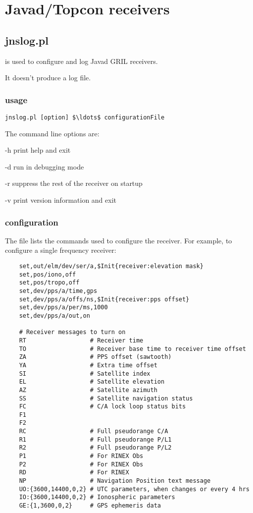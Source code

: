\section{Javad/Topcon receivers}

\subsection{jnslog.pl}
\hypertarget{h:jnslog}{}

 is used to configure and log Javad GRIL receivers.

It doesn't produce a log file.

\subsubsection{usage}

\begin{lstlisting}[mathescape=true]
jnslog.pl [option] $\ldots$ configurationFile
\end{lstlisting}

The command line options are:
\begin{description*}
 \item[-h] print help and exit
 \item[-d] run in debugging mode
 \item[-r] suppress the rest of the receiver on startup
 \item[-v] print version information and exit
\end{description*}

\subsubsection{configuration}

The file  lists the commands used to configure the receiver.
For example, to configure a single frequency receiver:
\begin{lstlisting}
    set,out/elm/dev/ser/a,$Init{receiver:elevation mask}
    set,pos/iono,off  
    set,pos/tropo,off 
    set,dev/pps/a/time,gps
    set,dev/pps/a/offs/ns,$Init{receiver:pps offset}
    set,dev/pps/a/per/ms,1000
    set,dev/pps/a/out,on
    
    # Receiver messages to turn on
    RT                  # Receiver time
    TO                  # Receiver base time to receiver time offset
    ZA                  # PPS offset (sawtooth)
    YA                  # Extra time offset 
    SI                  # Satellite index
    EL                  # Satellite elevation
    AZ                  # Satellite azimuth
    SS                  # Satellite navigation status
    FC                  # C/A lock loop status bits
    F1 
    F2 
    RC                  # Full pseudorange C/A
    R1                  # Full pseudorange P/L1
    R2                  # Full pseudorange P/L2
    P1                  # For RINEX Obs
    P2                  # For RINEX Obs
    RD                  # For RINEX
    NP                  # Navigation Position text message
    UO:{3600,14400,0,2} # UTC parameters, when changes or every 4 hrs
    IO:{3600,14400,0,2} # Ionospheric parameters
    GE:{1,3600,0,2}     # GPS ephemeris data
\end{lstlisting}

